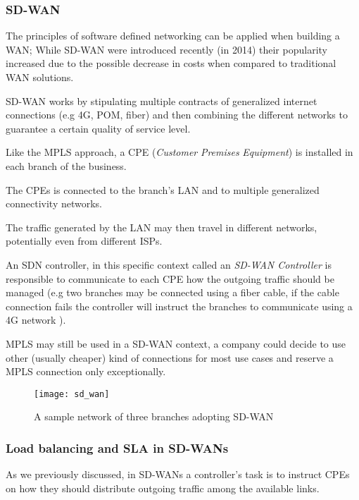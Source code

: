 \subsubsection{SD-WAN}
The principles of software defined networking can be applied when building a WAN;
While SD-WAN were introduced recently (in 2014) their popularity increased due to the possible decrease in costs when compared to traditional WAN solutions.

SD-WAN works by stipulating multiple contracts of generalized internet connections (e.g 4G, POM, fiber) and then combining the different networks to guarantee a certain quality of service level.

Like the MPLS approach, a CPE (\textit{Customer} \textit{Premises} \textit{Equipment}) is installed in each branch of the business.

The CPEs is connected to the branch's LAN and to multiple generalized connectivity networks.

The traffic generated by the LAN may then travel in different networks, potentially even from different ISPs.

An SDN controller, in this specific context called an \textit{SD-WAN Controller} is responsible to communicate to each CPE how the outgoing traffic should be managed (e.g two branches may be connected using a fiber cable, if the cable connection fails the controller will instruct the branches to communicate using a 4G network ).

MPLS may still be used in a SD-WAN context, a company could decide to use other (usually cheaper) kind of connections for most use cases and reserve a MPLS connection only exceptionally.

\pagebreak

\begin{figure}[t]
\texttt{[image: sd\_wan]}
\caption{A sample network of three branches adopting SD-WAN}

\centering
\end{figure}


\subsubsection{Load balancing and SLA in SD-WANs}

As we previously discussed, in SD-WANs a controller's task is to instruct CPEs on how they should distribute outgoing traffic among the available links. \\

